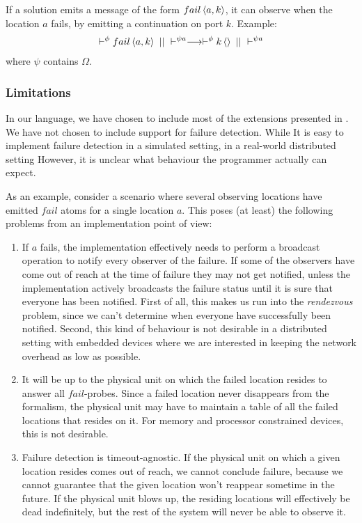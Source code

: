 If a solution emits a message of the form $\atm fail<a,k>$, it can observe
when the location $a$ fails, by emitting a continuation on port $k$. Example:
\begin{align*}
 \vdash^\phi \atm fail<a, k> ~||~ \vdash^{\psi a} \longrightarrow \vdash^\phi
 \atm k<> ~||~ \vdash^{\psi a}
\end{align*}
where $\psi$ contains $\Omega$.

\subsubsection{Limitations}

In our language, we have chosen to include most of the extensions presented in
\cite{fournet1996calculus}. We have not chosen to include support for failure
detection. While It is easy to implement failure detection in a simulated setting,
in a real-world distributed setting However, it is unclear what behaviour the
programmer actually can expect.

As an example, consider a scenario where several observing locations have
emitted $fail$ atoms for a single location $a$. This poses (at least) the
following problems from an implementation point of view:
\begin{enumerate}
 \item If $a$ fails, the implementation effectively needs to perform a broadcast
 operation to notify every observer of the failure. If some of the observers
 have come out of reach at the time of failure they may not get notified, unless
 the implementation actively broadcasts the failure status until it is sure that
 everyone has been notified. First of all, this makes us run into the
 \emph{rendezvous} problem, since we can't determine when everyone have
 successfully been notified. Second, this kind of behaviour is not desirable in
 a distributed setting with embedded devices where we are interested in keeping
 the network overhead as low as possible.

 \item It will be up to the physical unit on which the failed location resides
 to answer all $fail$-probes. Since a failed location never disappears from the
 formalism, the physical unit may have to maintain a table of all the failed
 locations that resides on it. For memory and processor constrained devices,
 this is not desirable.

 \item Failure detection is timeout-agnostic. If the physical unit on which a
 given location resides comes out of reach, we cannot conclude failure, because
 we cannot guarantee that the given location won't reappear sometime in the
 future. If the physical unit blows up, the residing locations will effectively
 be dead indefinitely, but the rest of the system will never be able to observe
 it.
\end{enumerate}

